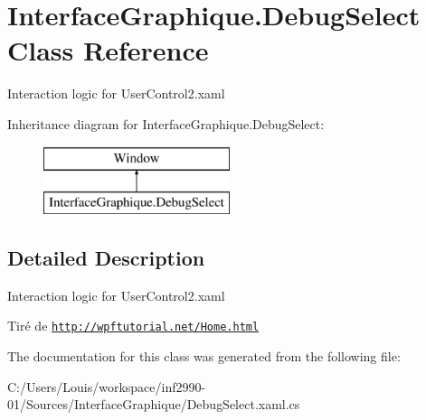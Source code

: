 \hypertarget{class_interface_graphique_1_1_debug_select}{}\section{Interface\+Graphique.\+Debug\+Select Class Reference}
\label{class_interface_graphique_1_1_debug_select}


Interaction logic for User\+Control2.\+xaml  


Inheritance diagram for Interface\+Graphique.\+Debug\+Select\+:\begin{figure}[H]
\begin{center}
\leavevmode
\includegraphics[height=2.000000cm]{class_interface_graphique_1_1_debug_select}
\end{center}
\end{figure}


\subsection{Detailed Description}
Interaction logic for User\+Control2.\+xaml 

Tiré de \href{http://wpftutorial.net/Home.html}{\tt http\+://wpftutorial.\+net/\+Home.\+html} 

The documentation for this class was generated from the following file\+:\begin{DoxyCompactItemize}
\item 
C\+:/\+Users/\+Louis/workspace/inf2990-\/01/\+Sources/\+Interface\+Graphique/Debug\+Select.\+xaml.\+cs\end{DoxyCompactItemize}
